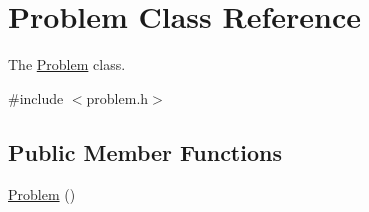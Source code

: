 \hypertarget{class_problem}{}\section{Problem Class Reference}
\label{class_problem}


The \hyperlink{class_problem}{Problem} class.  




{\ttfamily \#include $<$problem.\+h$>$}

\subsection*{Public Member Functions}
\begin{DoxyCompactItemize}
\item 
\hyperlink{class_problem_ad9d44f0ef936fb62f0ce41dd200494ac}{Problem} ()\hypertarget{class_problem_ad9d44f0ef936fb62f0ce41dd200494ac}{}\label{class_problem_ad9d44f0ef936fb62f0ce41dd200494ac}


\end{DoxyCompactItemize}
